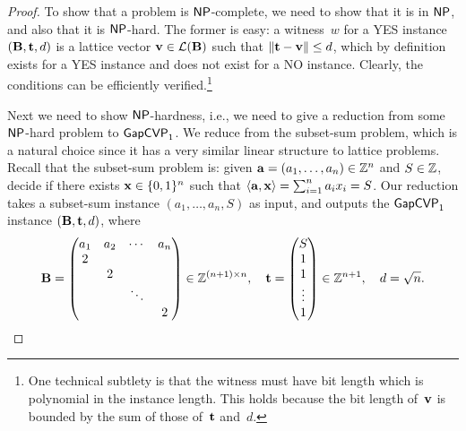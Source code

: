 \documentclass[11pt]{article}
\begin{document}
\begin{proof}
  To show that a problem is $\mathsf{NP}$-complete, we need to show that it is
  in $\mathsf{NP}$, and also that it is $\mathsf{NP}$-hard. The former is easy: a
  witness~$w$ for a YES instance $(\mathbf{B}, \mathbf{t}, d)$ is a lattice
  vector $\mathbf{v} \in \mathcal{L}(\mathbf{B})$ such that
  $\lVert\mathbf{t} - \mathbf{v}\rVert \leq d$, which by definition exists for a
  YES instance and does not exist for a NO instance. Clearly, the
  conditions can be efficiently verified.\footnote{One technical
    subtlety is that the witness must have bit length which is
    polynomial in the instance length. This holds because the bit
    length of~$\mathbf{v}$ is bounded by the sum of those of~$\mathbf{t}$
    and~$d$.}

  Next we need to show $\mathsf{NP}$-hardness, i.e., we need to give a
  reduction from some $\mathsf{NP}$-hard problem to $\mathsf{GapCVP}_{1}$. We reduce
  from the subset-sum problem, which is a natural choice since it has
  a very similar linear structure to lattice problems. Recall that the
  subset-sum problem is: given $\mathbf{a} = (a_1, \ldots, a_n) \in \mathbb{Z}^n$
  and $S \in \mathbb{Z}$, decide if there exists $\mathbf{x} \in \{0,1\}^{n}$ such
  that $\langle\mathbf{a}, \mathbf{x}\rangle = \sum_{i=1}^{n} a_{i} x_{i} = S$. Our
  reduction takes a subset-sum instance $(a_1, \ldots, a_n, S)$ as
  input, and outputs the $\mathsf{GapCVP}_{1}$ instance $(\mathbf{B}, \mathbf{t}, d)$,
  where
  \[ \mathbf{B} =
    \begin{pmatrix}
      a_1 & a_2 & \cdots & a_n \\
      2 &   &   &   \\
          & 2 &   &   \\
          &   & \ddots &   \\
          &   &   & 2
    \end{pmatrix} \in \mathbb{Z}^{(n+1) \times n}, \quad
    \mathbf{t} =
    \begin{pmatrix}
      S \\
      1 \\
      1 \\
      \vdots \\
      1
    \end{pmatrix} \in \mathbb{Z}^{n+1}, \quad d = \sqrt{n}. \]


\end{proof}
\end{document}
